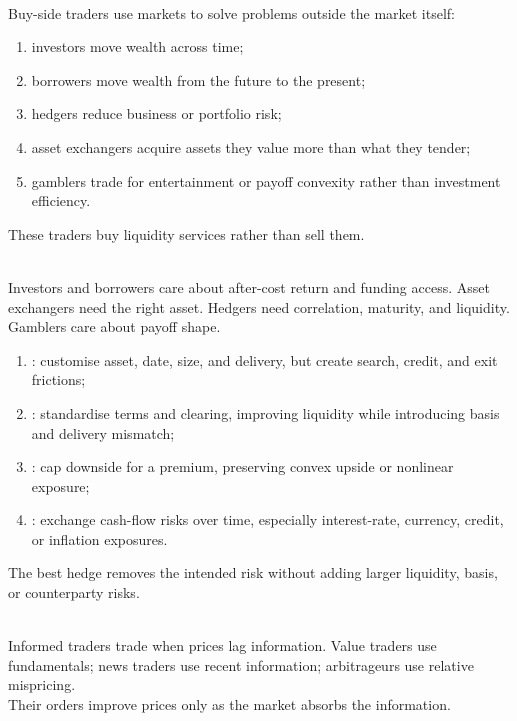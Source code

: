 \begin{taxonomy} \\
Buy-side traders use markets to solve problems outside the market itself:
\begin{enumerate}[label=\roman*.]
\setlength{\itemsep}{0pt}
\item investors move wealth across time;
\item borrowers move wealth from the future to the present;
\item hedgers reduce business or portfolio risk;
\item asset exchangers acquire assets they value more than what they tender;
\item gamblers trade for entertainment or payoff convexity rather than investment efficiency.
\end{enumerate}
These traders buy liquidity services rather than sell them.
\end{taxonomy}

\begin{principle} \\
Investors and borrowers care about after-cost return and funding access. Asset exchangers need the right asset. Hedgers need correlation, maturity, and liquidity. Gamblers care about payoff shape.
\end{principle}

\begin{taxonomy} 
\begin{enumerate}[label=\roman*.]
\setlength{\itemsep}{0pt}
\item {}: customise asset, date, size, and delivery, but create search, credit, and exit frictions;
\item {}: standardise terms and clearing, improving liquidity while introducing basis and delivery mismatch;
\item {}: cap downside for a premium, preserving convex upside or nonlinear exposure;
\item {}: exchange cash-flow risks over time, especially interest-rate, currency, credit, or inflation exposures.
\end{enumerate}
The best hedge removes the intended risk without adding larger liquidity, basis, or counterparty risks.
\end{taxonomy}

\begin{taxonomy} \\
Informed traders trade when prices lag information. Value traders use fundamentals; news traders use recent information; arbitrageurs use relative mispricing.\\
Their orders improve prices only as the market absorbs the information.
\end{taxonomy}

